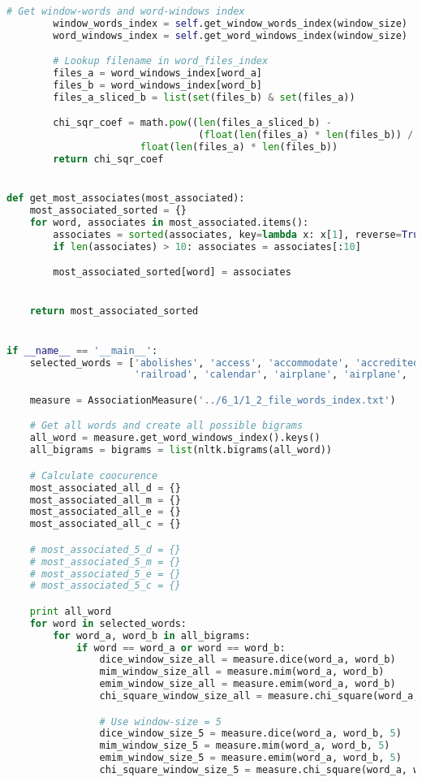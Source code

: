 \documentclass[letterpaper,11pt]{article}
\begin{document}
\begin{lstlisting}[language=python, caption={Association Measure}, label={lst:assoc_measure}]
        # Get window-words and word-windows index
        window_words_index = self.get_window_words_index(window_size)
        word_windows_index = self.get_word_windows_index(window_size)

        # Lookup filename in word_files_index
        files_a = word_windows_index[word_a]
        files_b = word_windows_index[word_b]
        files_a_sliced_b = list(set(files_b) & set(files_a))

        chi_sqr_coef = math.pow((len(files_a_sliced_b) -
                                 (float(len(files_a) * len(files_b)) / len(window_words_index))), 2) / \
                       float(len(files_a) * len(files_b))
        return chi_sqr_coef


def get_most_associates(most_associated):
    most_associated_sorted = {}
    for word, associates in most_associated.items():
        associates = sorted(associates, key=lambda x: x[1], reverse=True)
        if len(associates) > 10: associates = associates[:10]

        most_associated_sorted[word] = associates


    return most_associated_sorted


if __name__ == '__main__':
    selected_words = ['abolishes', 'access', 'accommodate', 'accredited', 'sky',
                      'railroad', 'calendar', 'airplane', 'airplane', 'bicycle']

    measure = AssociationMeasure('../6_1/1_2_file_words_index.txt')

    # Get all words and create all possible bigrams
    all_word = measure.get_word_windows_index().keys()
    all_bigrams = bigrams = list(nltk.bigrams(all_word))

    # Calculate coocurence
    most_associated_all_d = {}
    most_associated_all_m = {}
    most_associated_all_e = {}
    most_associated_all_c = {}

    # most_associated_5_d = {}
    # most_associated_5_m = {}
    # most_associated_5_e = {}
    # most_associated_5_c = {}

    print all_word
    for word in selected_words:
        for word_a, word_b in all_bigrams:
            if word == word_a or word == word_b:
                dice_window_size_all = measure.dice(word_a, word_b)
                mim_window_size_all = measure.mim(word_a, word_b)
                emim_window_size_all = measure.emim(word_a, word_b)
                chi_square_window_size_all = measure.chi_square(word_a, word_b)

                # Use window-size = 5
                dice_window_size_5 = measure.dice(word_a, word_b, 5)
                mim_window_size_5 = measure.mim(word_a, word_b, 5)
                emim_window_size_5 = measure.emim(word_a, word_b, 5)
                chi_square_window_size_5 = measure.chi_square(word_a, word_b, 5)


\end{lstlisting}
\end{document}

